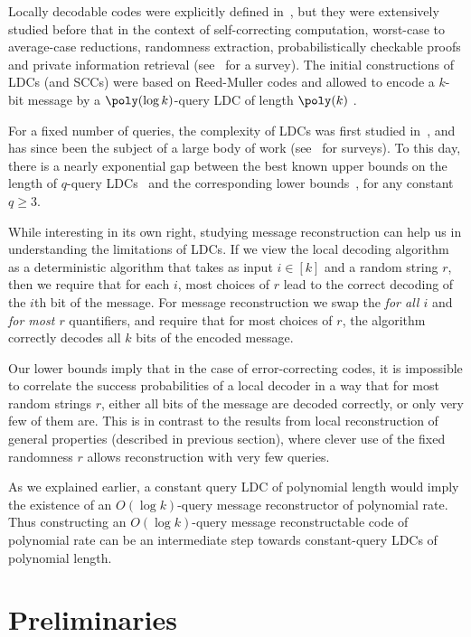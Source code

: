 Locally decodable codes were explicitly
defined in~\cite{katz-trevisan}, but they were extensively studied before that in the context of self-correcting computation, worst-case to average-case reductions, randomness extraction,
probabilistically checkable proofs and private information retrieval (see~\cite{trevisan} for a survey).
The initial constructions of
LDCs (and SCCs) were based on Reed-Muller codes and allowed to encode a $k$-bit message by a
$\poly(\log k)$-query LDC of length $\poly(k)$ \cite{bfls,CGKS}.

For a fixed number of queries, the complexity of LDCs was first studied
in~\cite{katz-trevisan}, and has since been the subject of a large body of work
(see~\cite{trevisan, gasarch} for surveys). To this day, there is a nearly exponential gap between the
best known upper bounds on the length of $q$-query LDCs~\cite{Yek,efremenko} and the corresponding lower bounds~\cite{kdw,wdw,woodruff}, for any constant $q \geq 3$.

While interesting 
%
in its own right,
studying message reconstruction can help us in understanding the limitations
of LDCs. If we view the local decoding algorithm as a deterministic algorithm that takes as input $i \in [k]$ and
a random string $r$, then we require that for each $i$, most choices of $r$
lead to the correct decoding of the $i$th bit of the message.
For message reconstruction we swap the \emph{for all $i$} and \emph{for most $r$} quantifiers, and
require that for most choices of $r$, the algorithm correctly decodes all $k$ bits of the encoded message.

Our lower bounds imply that in the case of error-correcting codes, it is impossible to correlate the success probabilities of a local decoder in a way that for most random strings $r$, either all bits of the message are decoded correctly, or only very few of them are. This is in contrast to the results from local reconstruction of general properties (described in previous section), where clever use of the fixed randomness $r$ allows reconstruction with very few queries.

As we explained earlier, a constant query LDC of polynomial length would imply the existence of an $O(\log k)$-query
message reconstructor of polynomial rate. Thus constructing an $O(\log k)$-query message reconstructable code of
polynomial rate can be an intermediate step towards
constant-query LDCs of polynomial length.

\section{Preliminaries}

